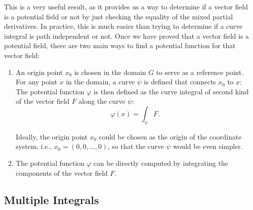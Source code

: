 This is a very useful result, as it provides us a way to determine if a vector field is a potential field or not by just checking the equality of the mixed partial derivatives. In practice, this is much easier than trying to determine if a curve integral is path independent or not. Once we have proved that a vector field is a potential field, there are two main ways to find a potential function for that vector field:
\begin{enumerate}
    \item An origin point $x_0$ is chosen in the domain $G$ to serve as a reference point. For any point $x$ in the domain, a curve $\psi$ is defined that connects $x_0$ to $x$:
    The potential function $\varphi$ is then defined as the curve integral of second kind of the vector field $F$ along the curve $\psi$:
    \[
        \varphi(x) = \int_\psi F.
    \]

    Ideally, the origin point $x_0$ could be chosen as the origin of the coordinate system, i.e., $x_0 = (0, 0, \dots, 0)$, so that the curve $\psi$ would be even simpler.

    \item The potential function $\varphi$ can be directly computed by integrating the components of the vector field $F$.
\end{enumerate}

\subsection{Multiple Integrals}

